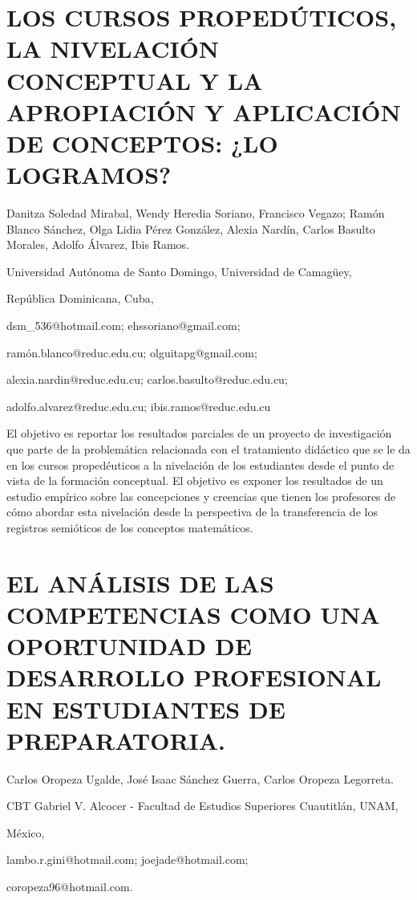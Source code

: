 \section{LOS CURSOS PROPEDÚTICOS, LA NIVELACIÓN CONCEPTUAL Y LA APROPIACIÓN
Y APLICACIÓN DE CONCEPTOS: ¿LO LOGRAMOS? }

\begin{datos}

Danitza Soledad Mirabal, Wendy Heredia Soriano, Francisco Vegazo;
Ramón Blanco Sánchez, Olga Lidia Pérez González, Alexia Nardín, Carlos
Basulto Morales, Adolfo Álvarez, Ibis Ramos.

Universidad Autónoma de Santo Domingo, Universidad de Camagüey,

República Dominicana, Cuba,

dsm\_536@hotmail.com; ehssoriano@gmail.com; 

ramón.blanco@reduc.edu.cu; olguitapg@gmail.com;

alexia.nardin@reduc.edu.cu; carlos.basulto@reduc.edu.cu; 

adolfo.alvarez@reduc.edu.cu; ibis.ramos@reduc.edu.cu

\end{datos}

El objetivo es reportar los resultados parciales de un proyecto de
investigación que parte de la problemática relacionada con el tratamiento
didáctico que se le da en los cursos propedéuticos a la nivelación
de los estudiantes desde el punto de vista de la formación conceptual.
El objetivo es exponer los resultados de un estudio empírico sobre
las concepciones y creencias que tienen los profesores de cómo abordar
esta nivelación desde la perspectiva de la transferencia de los registros
semióticos de los conceptos matemáticos. 


\section{EL ANÁLISIS DE LAS COMPETENCIAS COMO UNA OPORTUNIDAD DE DESARROLLO
PROFESIONAL EN ESTUDIANTES DE PREPARATORIA.}

\begin{datos}

Carlos Oropeza Ugalde, José Isaac Sánchez Guerra, Carlos Oropeza Legorreta. 

CBT Gabriel V. Alcocer - Facultad de Estudios Superiores Cuautitlán,
UNAM,

México, 

lambo.r.gini@hotmail.com; joejade@hotmail.com;

coropeza96@hotmail.com.

\end{datos}

